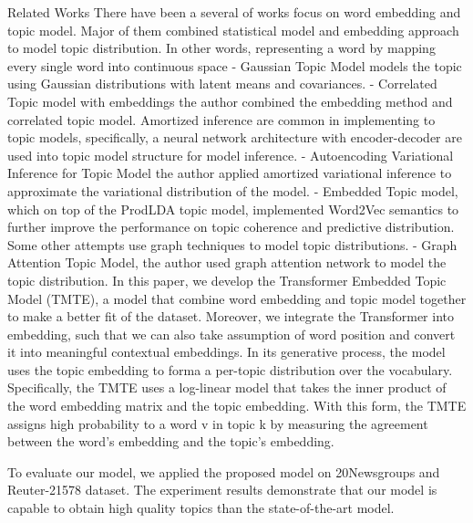 Related Works
There have been a several of works focus on word embedding and topic model. Major of them combined statistical model and embedding approach to model topic distribution. In other words, representing a word by mapping every single word into continuous space
-	Gaussian Topic Model models the topic using Gaussian distributions with latent means and covariances. 
-	Correlated Topic model with embeddings the author combined the embedding method and correlated topic model. 
Amortized inference are common in implementing to topic models, specifically, a neural network architecture with encoder-decoder are used into topic model structure for model inference.
-	Autoencoding Variational Inference for Topic Model the author applied amortized variational inference to approximate the variational distribution of the model.
-	Embedded Topic model, which on top of the ProdLDA topic model, implemented Word2Vec semantics to further improve the performance on topic coherence and predictive distribution.
Some other attempts use graph techniques to model topic distributions.
-	Graph Attention Topic Model, the author used graph attention network to model the topic distribution. 
In this paper, we develop the Transformer Embedded Topic Model (TMTE), a model that combine word embedding and topic model together to make a better fit of the dataset. Moreover, we integrate the Transformer into embedding, such that we can also take assumption of word position and convert it into meaningful contextual embeddings. 
In its generative process, the model uses the topic embedding to forma a per-topic distribution over the vocabulary. Specifically, the TMTE uses a log-linear model that takes the inner product of the word embedding matrix and the topic embedding.
With this form, the TMTE assigns high probability to a word v in topic k by measuring the agreement between the word’s embedding and the topic’s embedding.

To evaluate our model, we applied the proposed model on 20Newsgroups and Reuter-21578 dataset. The experiment results demonstrate that our model is capable to obtain high quality topics than the state-of-the-art model. 